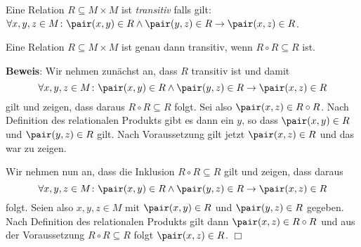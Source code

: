 \begin{Definition}
Eine Relation $R \subseteq M \times M$  ist \emph{transitiv} falls gilt: \\[0.2cm]
\hspace*{1.3cm} 
$\forall x, y, z \in M \colon \pair(x,y) \in R \wedge \pair(y,z) \in R \rightarrow \pair(x,z) \in
R$.
\end{Definition}

\begin{Satz}
Eine Relation $R \subseteq M \times M$  ist genau dann transitiv, wenn
$R \circ R \subseteq R$ ist.
\end{Satz}

\noindent
\textbf{Beweis}:  Wir nehmen zun\"{a}chst an, dass $R$ transitiv ist und damit
\[ \forall x, y, z \in M \colon \pair(x,y) \in R \wedge \pair(y,z) \in R \rightarrow \pair(x,z) \in R \]
gilt und zeigen, dass daraus $R \circ R \subseteq R$ folgt.
Sei also $\pair(x,z) \in R \circ R$.  Nach Definition des relationalen Produkts gibt es
dann ein $y$, so dass $\pair(x,y) \in R$ und $\pair(y,z) \in R$ gilt.
Nach Voraussetzung gilt jetzt $\pair(x,z) \in R$ und das war zu zeigen.

Wir nehmen nun an, dass die Inklusion $R \circ R \subseteq R$ gilt und zeigen, dass daraus
\[ \forall x, y, z \in M \colon \pair(x,y) \in R \wedge \pair(y,z) \in R \rightarrow \pair(x,z) \in R \]
folgt.  Seien also $x,y,z \in M$ mit $\pair(x,y) \in R$ und $\pair(y,z) \in R$ gegeben.
Nach Definition des relationalen Produkts gilt dann $\pair(x,z) \in R \circ R$ und aus
der Voraussetzung $R \circ R \subseteq R$ folgt  $\pair(x,z) \in R$. \hspace*{\fill} $\Box$




